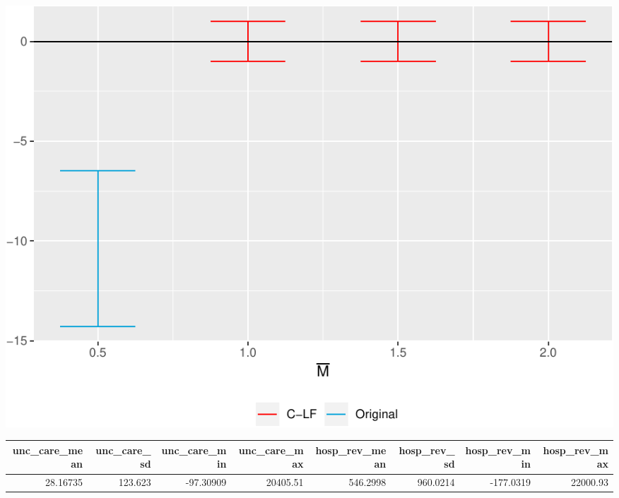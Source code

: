 \documentclass[
]{article}
\begin{document}
\includegraphics{Report_files/figure-latex/Figures-10.pdf}

\begin{tabular}{r|r|r|r|r|r|r|r}
\hline
unc\_care\_mean & unc\_care\_sd & unc\_care\_min & unc\_care\_max & hosp\_rev\_mean & hosp\_rev\_sd & hosp\_rev\_min & hosp\_rev\_max\\
\hline
28.16735 & 123.623 & -97.30909 & 20405.51 & 546.2998 & 960.0214 & -177.0319 & 22000.93\\
\hline
\end{tabular}
\end{document}
